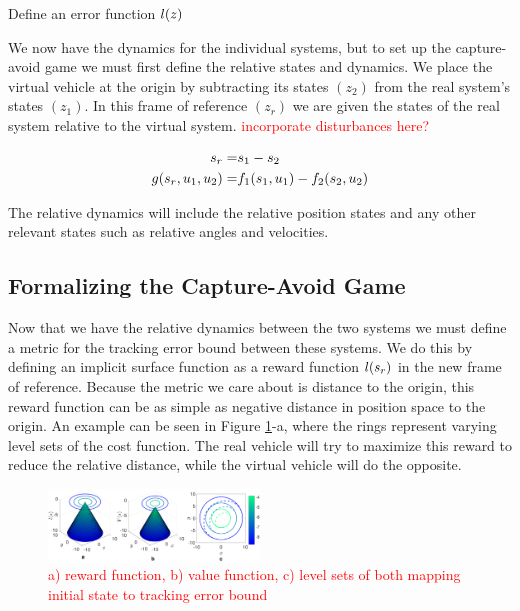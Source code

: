 Define an error function $l(z)$

We now have the dynamics for the individual systems, but to set up the capture-avoid game we must first define the relative states and dynamics. We place the virtual vehicle at the origin by subtracting its states $(z_2)$ from the real system's states $(z_1)$. In this frame of reference $(z_r)$ we are given the states of the real system relative to the virtual system. \textcolor{red}{incorporate disturbances here?}


\begin{equation}
\begin{aligned}
s_r =& s_1 - s_2 \\
g(s_r,u_1,u_2) =& f_1(s_1,u_1) - f_2(s_2,u_2)
\end{aligned}
\end{equation}

The relative dynamics will include the relative position states and any other relevant states such as relative angles and velocities.

\subsection{Formalizing the Capture-Avoid Game}

Now that we have the relative dynamics between the two systems we must define a metric for the tracking error bound between these systems. We do this by defining an implicit surface function as a reward function $l(s_r)$ in the new frame of reference. Because the metric we care about is distance to the origin, this reward function can be as simple as negative distance in position space to the origin. An example can be seen in Figure \ref{fig:quad4D_example}-a, where the rings represent varying level sets of the cost function. The real vehicle will try to maximize this reward to reduce the relative distance, while the virtual vehicle will do the opposite.

\begin{figure}
	\centering
	\includegraphics[width=0.5\textwidth]{fig/quad4D_example}
	\caption{\textcolor{red}{a) reward function, b) value function, c) level sets of both mapping initial state to tracking error bound}}
	\label{fig:quad4D_example}
\end{figure} 
 

